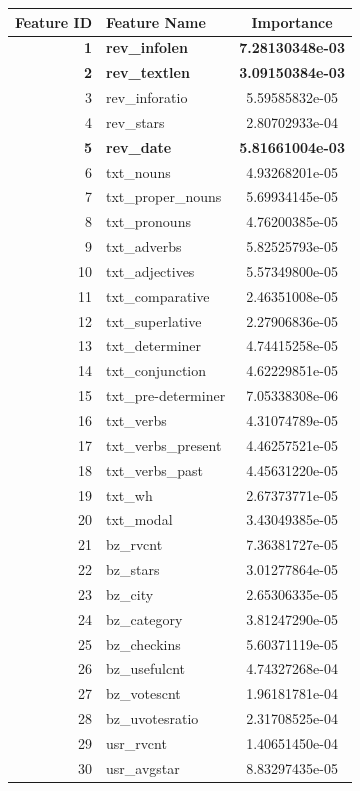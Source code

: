 \documentclass[a4paper,12pt,title]{article}
\begin{document}
\begin{center}
\begin{tabular}{rlc}
\textbf{Feature ID} & \textbf{Feature Name} & \textbf{Importance}\\
\hline
\hline
\bfseries{1} & \bfseries{rev\_infolen} & \bfseries{7.28130348e-03}\\
\bfseries{2} & \bfseries{rev\_textlen} & \bfseries{3.09150384e-03}\\
3 & rev\_inforatio & 5.59585832e-05\\
4 & rev\_stars & 2.80702933e-04\\
\bfseries{5} & \bfseries{rev\_date} & \bfseries{5.81661004e-03}\\
6 & txt\_nouns & 4.93268201e-05\\
7 & txt\_proper\_nouns & 5.69934145e-05\\
8 & txt\_pronouns & 4.76200385e-05\\
9 & txt\_adverbs & 5.82525793e-05\\
10 & txt\_adjectives & 5.57349800e-05\\
11 & txt\_comparative & 2.46351008e-05\\
12 & txt\_superlative & 2.27906836e-05\\
13 & txt\_determiner & 4.74415258e-05\\
14 & txt\_conjunction & 4.62229851e-05\\
15 & txt\_pre-determiner & 7.05338308e-06\\
16 & txt\_verbs & 4.31074789e-05\\
17 & txt\_verbs\_present & 4.46257521e-05\\
18 & txt\_verbs\_past & 4.45631220e-05\\
19 & txt\_wh & 2.67373771e-05\\
20 & txt\_modal & 3.43049385e-05\\
21 & bz\_rvcnt & 7.36381727e-05\\
22 & bz\_stars & 3.01277864e-05\\
23 & bz\_city & 2.65306335e-05\\
24 & bz\_category & 3.81247290e-05\\
25 & bz\_checkins & 5.60371119e-05\\
26 & bz\_usefulcnt & 4.74327268e-04\\
27 & bz\_votescnt & 1.96181781e-04\\
28 & bz\_uvotesratio & 2.31708525e-04\\
29 & usr\_rvcnt & 1.40651450e-04\\
30 & usr\_avgstar & 8.83297435e-05\\

\end{tabular}
\end{center}
\end{document}
